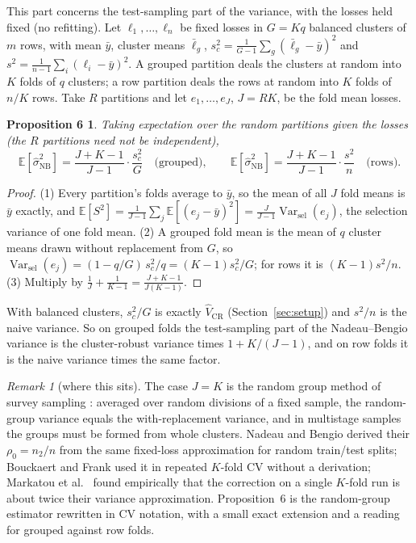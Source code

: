 \documentclass[11pt]{amsart}
\theoremstyle{plain}
\newtheorem*{prop6}{Proposition 6}
\theoremstyle{definition}
\theoremstyle{remark}
\newtheorem*{rem}{Remark}
\newcommand{\Var}{\operatorname{Var}}
\newcommand{\E}{\mathbb{E}}
\newcommand{\VCR}{\hat V_{\mathrm{CR}}}
\newcommand{\VNB}{\hat\sigma^2_{\mathrm{NB}}}
\begin{document}
This part concerns the test-sampling part of the variance, with the losses held fixed (no refitting). Let $\ell_1,\dots,\ell_n$ be fixed losses in $G=Kq$ balanced clusters of $m$ rows, with mean $\bar y$, cluster means $\bar\ell_g$, $s_c^2=\frac1{G-1}\sum_g(\bar\ell_g-\bar y)^2$ and $s^2=\frac1{n-1}\sum_i(\ell_i-\bar y)^2$. A grouped partition deals the clusters at random into $K$ folds of $q$ clusters; a row partition deals the rows at random into $K$ folds of $n/K$ rows. Take $R$ partitions and let $e_1,\dots,e_J$, $J=RK$, be the fold mean losses.

\begin{prop6}
Taking expectation over the random partitions given the losses (the $R$ partitions need not be independent),
\[
\E[\VNB]=\frac{J+K-1}{J-1}\cdot\frac{s_c^2}{G}\quad\text{(grouped)},\qquad
\E[\VNB]=\frac{J+K-1}{J-1}\cdot\frac{s^2}{n}\quad\text{(rows)}.
\]
\end{prop6}

\begin{proof}
(1) Every partition's folds average to $\bar y$, so the mean of all $J$ fold means is $\bar y$ exactly, and $\E[S^2]=\frac1{J-1}\sum_j\E[(e_j-\bar y)^2]=\frac{J}{J-1}\Var_{\mathrm{sel}}(e_j)$, the selection variance of one fold mean. (2) A grouped fold mean is the mean of $q$ cluster means drawn without replacement from $G$, so $\Var_{\mathrm{sel}}(e_j)=(1-q/G)\,s_c^2/q=(K-1)s_c^2/G$; for rows it is $(K-1)s^2/n$. (3) Multiply by $\frac1J+\frac1{K-1}=\frac{J+K-1}{J(K-1)}$.
\end{proof}

With balanced clusters, $s_c^2/G$ is exactly $\VCR$ (Section~\ref{sec:setup}) and $s^2/n$ is the naive variance. So on grouped folds the test-sampling part of the Nadeau--Bengio variance is the cluster-robust variance times $1+K/(J-1)$, and on row folds it is the naive variance times the same factor.

\begin{rem}[where this sits]
The case $J=K$ is the random group method of survey sampling \cite[Chapter~2]{Wolter}: averaged over random divisions of a fixed sample, the random-group variance equals the with-replacement variance, and in multistage samples the groups must be formed from whole clusters. Nadeau and Bengio \cite{NB} derived their $\rho_0=n_2/n$ from the same fixed-loss approximation for random train/test splits; Bouckaert and Frank \cite{BF} used it in repeated $K$-fold CV without a derivation; Markatou et al.\ \cite{Markatou} found empirically that the correction on a single $K$-fold run is about twice their variance approximation. Proposition~6 is the random-group estimator rewritten in CV notation, with a small exact extension and a reading for grouped against row folds.
\end{rem}
\end{document}
